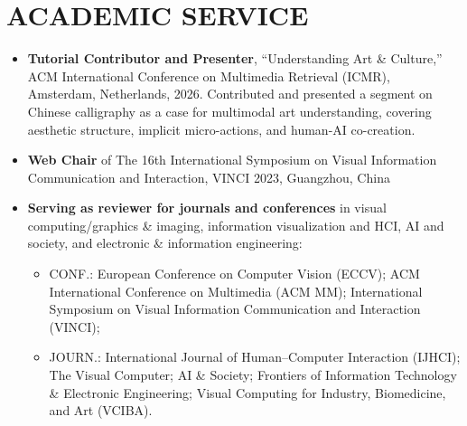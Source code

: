 \section* {ACADEMIC SERVICE}

\begin{itemize}[leftmargin=*]
    \item \noindent\textbf{Tutorial Contributor and Presenter}, “Understanding Art \& Culture,” ACM International Conference on Multimedia Retrieval (ICMR), Amsterdam, Netherlands, 2026.
    Contributed and presented a segment on Chinese calligraphy as a case for multimodal art understanding, covering aesthetic structure, implicit micro-actions, and human-AI co-creation.

    \item \textbf{Web Chair} of The 16th International Symposium on Visual Information Communication and Interaction, VINCI 2023, Guangzhou, China
    \item \noindent \textbf{Serving as reviewer for journals and conferences} in visual computing/graphics \& imaging, information visualization and HCI, AI and society, and electronic \& information engineering:
    \begin{itemize}
         \item CONF.: European Conference on Computer Vision (ECCV); ACM International Conference on Multimedia (ACM MM); International Symposium on Visual Information Communication and Interaction (VINCI);
         \item JOURN.: International Journal of Human--Computer Interaction (IJHCI); The Visual Computer; AI \& Society; Frontiers of Information Technology \& Electronic Engineering; Visual Computing for Industry, Biomedicine, and Art (VCIBA).
    \end{itemize}
\end{itemize}

